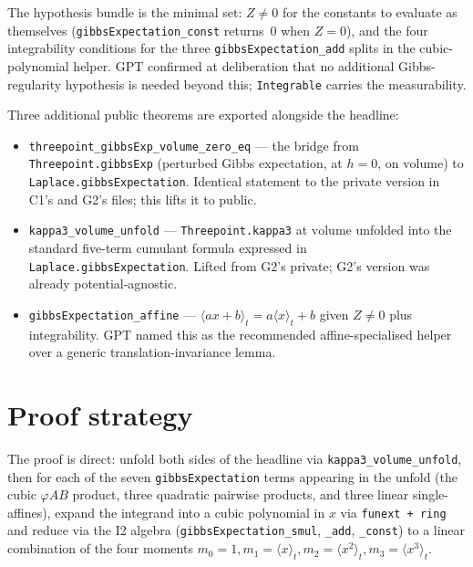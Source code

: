 \documentclass[11pt]{article}
\begin{document}
The hypothesis bundle is the minimal set: $Z \neq 0$ for the constants
to evaluate as themselves (\texttt{gibbsExpectation\_const} returns~$0$
when $Z = 0$), and the four integrability conditions for the three
\texttt{gibbsExpectation\_add} splits in the cubic-polynomial helper.
GPT confirmed at deliberation that no additional Gibbs-regularity
hypothesis is needed beyond this; \texttt{Integrable} carries the
measurability.

Three additional public theorems are exported alongside the headline:

\begin{itemize}[leftmargin=1em,itemsep=0.2em]
\item \texttt{threepoint\_gibbsExp\_volume\_zero\_eq} — the bridge
  from \texttt{Threepoint.gibbsExp} (perturbed Gibbs expectation, at
  $h = 0$, on $\mathrm{volume}$) to \texttt{Laplace.gibbsExpectation}.
  Identical statement to the private version in C1's and G2's files;
  this lifts it to public.
\item \texttt{kappa3\_volume\_unfold} — \texttt{Threepoint.kappa3} at
  $\mathrm{volume}$ unfolded into the standard five-term cumulant
  formula expressed in \texttt{Laplace.gibbsExpectation}. Lifted from
  G2's private; G2's version was already potential-agnostic.
\item \texttt{gibbsExpectation\_affine} — $\langle a x + b \rangle_t
  = a \langle x \rangle_t + b$ given $Z \neq 0$ plus integrability.
  GPT named this as the recommended affine-specialised helper over a
  generic translation-invariance lemma.
\end{itemize}

\section{Proof strategy}

The proof is direct: unfold both sides of the headline via
\texttt{kappa3\_volume\_unfold}, then for each of the seven
\texttt{gibbsExpectation} terms appearing in the unfold (the cubic
$\varphi A B$ product, three quadratic pairwise products, and three
linear single-affines), expand the integrand into a cubic polynomial
in $x$ via \texttt{funext + ring} and reduce via the I2 algebra
(\texttt{gibbsExpectation\_smul}, \texttt{\_add}, \texttt{\_const})
to a linear combination of the four moments
$m_0 = 1, m_1 = \langle x \rangle_t, m_2 = \langle x^2 \rangle_t,
m_3 = \langle x^3 \rangle_t$.
\end{document}
